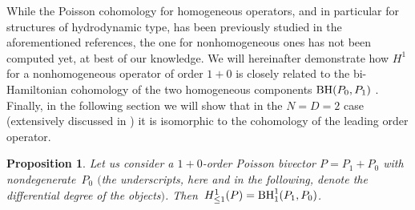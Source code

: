 \documentclass[pdftex]{sigma}
\numberwithin{equation}{section}
\newtheorem{Proposition}[Theorem]{Proposition}
 { \theoremstyle{definition}
\newtheorem{Definition}[Theorem]{Definition}
\newtheorem{Note}[Theorem]{Note}
\newtheorem{Example}[Theorem]{Example}
\newtheorem{Remark}[Theorem]{Remark} }
\begin{document}
While the Poisson cohomology for homogeneous operators, and in particular for structures of hydrodynamic type, has been previously studied in the aforementioned references, the one for nonhomogeneous ones has not been computed yet, at best of our knowledge. We will hereinafter demonstrate how $H^1$ for a nonhomogeneous operator of order $1{+}0$ is closely related to the bi-Hamiltonian cohomology of the two homogeneous components ${\rm BH}(P_0,P_1)$ \cite{lz05}. Finally, in the following section we will show that in the $N=D=2$ case (extensively discussed in \cite{casati2015deformations}) it is isomorphic to the cohomology of the leading order operator.
\begin{Proposition}\label{prop:biham}
Let us consider a $1{+}0$-order Poisson bivector $P=P_1+P_0$ with nondegenerate~$P_0$ $($the underscripts, here and in the following, denote the \emph{differential degree} of the objects$)$. Then~${H^1_{\leq 1}(P)={\rm BH}^1_{1}(P_1,P_0)}$.
\end{Proposition}
\end{document}
